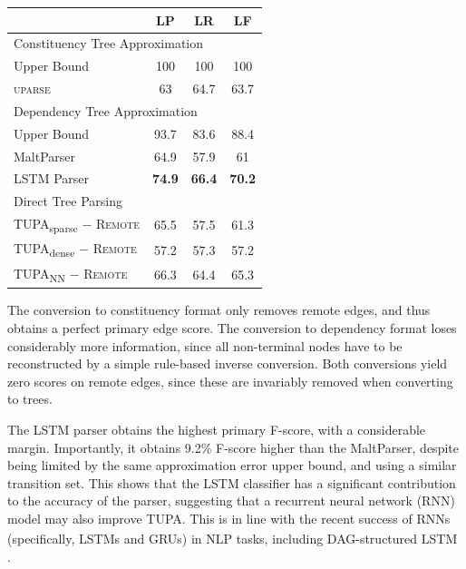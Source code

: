 \documentclass[a0,portrait]{a0poster}
\newcommand{\parser}[1]{TUPA\textsubscript{#1}}
\begin{document}
\begin{multicols}{2}
\begin{center}
\begin{tabular}{l|ccc}
& \textbf{LP} & \textbf{LR} & \textbf{LF} \\
\hline
\multicolumn{4}{l}{\rule{0pt}{2ex} \footnotesize Constituency Tree Approximation} \\
Upper Bound & 100 & 100 & 100 \vspace{.1cm} \\
\textsc{uparse} & 63 & 64.7 & 63.7 \\
\hline
\multicolumn{4}{l}{\rule{0pt}{2ex} \footnotesize Dependency Tree Approximation} \\
Upper Bound & 93.7 & 83.6 & 88.4 \vspace{.1cm} \\
MaltParser & 64.9 & 57.9 & 61 \\
LSTM Parser & {\bf 74.9} & {\bf 66.4} & {\bf 70.2} \\
\hline
\multicolumn{4}{l}{\rule{0pt}{2ex} \footnotesize Direct Tree Parsing} \\
\parser{sparse} $-$ \textsc{Remote} & 65.5 & 57.5 & 61.3 \\
\parser{dense} $-$ \textsc{Remote} & 57.2 & 57.3 & 57.2 \\
\parser{NN} $-$ \textsc{Remote} & 66.3 & 64.4 & 65.3 \\
\end{tabular}
\end{center}

The conversion to constituency format only removes remote edges,
and thus obtains a perfect primary edge score.
The conversion to dependency format loses considerably more information, since
all non-terminal nodes have to be reconstructed by a simple rule-based inverse
conversion. Both conversions yield zero scores on remote edges,
since these are invariably removed when converting to trees.

The LSTM parser obtains the highest primary F-score,
with a considerable margin. Importantly, it obtains 9.2\% F-score
higher than the MaltParser,
despite being limited by the same approximation error upper bound,
and using a similar transition set.
This shows that the LSTM classifier has a significant contribution
to the accuracy of
the parser, suggesting that a recurrent neural network (RNN) model
may also improve \parser{}.
This is in line with the recent success of RNNs
(specifically, LSTMs and GRUs) in NLP tasks, including DAG-structured LSTM
\cite{zhu-sobhani-guo:2016:N16-1}.





\end{multicols}
\end{document}
